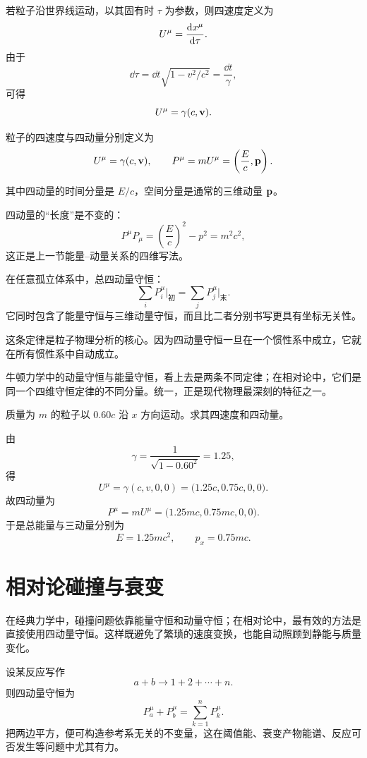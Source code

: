 若粒子沿世界线运动，以其固有时 $\tau$ 为参数，则四速度定义为
\[
U^\mu = \dv{x^\mu}{\tau}.
\]
由于
\[
\dd \tau = \dd t\sqrt{1-v^2/c^2}=\frac{\dd t}{\gamma},
\]
可得
\[
U^\mu = \gamma(c, \vb{v}).
\]

\begin{definition}[四速度与四动量]
粒子的四速度与四动量分别定义为
\[
U^\mu = \gamma(c,\vb{v}),
\qquad
P^\mu = mU^\mu = \left(\frac{E}{c},\vb{p}\right).
\]

其中四动量的时间分量是 $E/c$，空间分量是通常的三维动量 $\vb{p}$。
\end{definition}

四动量的“长度”是不变的：
\[
P^\mu P_\mu = \left(\frac{E}{c}\right)^2-p^2 = m^2c^2,
\]
这正是上一节能量--动量关系的四维写法。

\begin{law}[四动量守恒]
在任意孤立体系中，总四动量守恒：
\[
\sum_i P_i^\mu\bigg|_{\text{初}}=
\sum_j P_j^\mu\bigg|_{\text{末}}.
\]
它同时包含了能量守恒与三维动量守恒，而且比二者分别书写更具有坐标无关性。
\end{law}

这条定律是粒子物理分析的核心。因为四动量守恒一旦在一个惯性系中成立，它就在所有惯性系中自动成立。

\begin{remark}
牛顿力学中的动量守恒与能量守恒，看上去是两条不同定律；在相对论中，它们是同一个四维守恒定律的不同分量。统一，正是现代物理最深刻的特征之一。
\end{remark}

\begin{example}[四速度与四动量的计算]
质量为 $m$ 的粒子以 $0.60c$ 沿 $x$ 方向运动。求其四速度和四动量。

由
\[
\gamma=\frac{1}{\sqrt{1-0.60^2}}=1.25,
\]
得
\[
U^\mu = \gamma(c,v,0,0)=\bigl(1.25c,0.75c,0,0\bigr).
\]
故四动量为
\[
P^\mu = mU^\mu = \bigl(1.25mc,0.75mc,0,0\bigr).
\]
于是总能量与三动量分别为
\[
E=1.25mc^2,
\qquad
p_x=0.75mc.
\]
\end{example}

\section{相对论碰撞与衰变}

在经典力学中，碰撞问题依靠能量守恒和动量守恒；在相对论中，最有效的方法是直接使用四动量守恒。这样既避免了繁琐的速度变换，也能自动照顾到静能与质量变化。

设某反应写作
\[
a+b\to 1+2+\cdots+n.
\]
则四动量守恒为
\[
P_a^\mu+P_b^\mu = \sum_{k=1}^{n} P_k^\mu.
\]
把两边平方，便可构造参考系无关的不变量，这在阈值能、衰变产物能谱、反应可否发生等问题中尤其有力。

